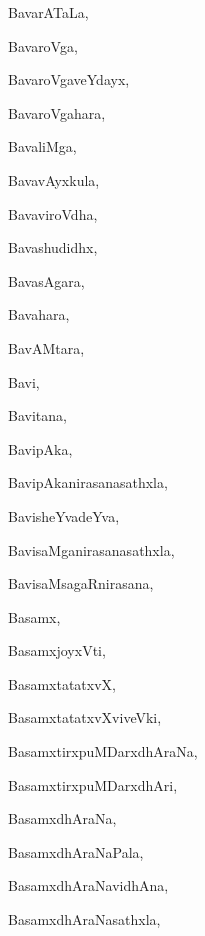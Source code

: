 \begin{multicols}{3}
{\noindent
{BavarATaLa}, \pageref{BavarATaLa}

\noindent
{BavaroVga}, \pageref{BavaroVga}

\noindent
{BavaroVgaveYdayx}, \pageref{BavaroVgaveYdayx}

\noindent
{BavaroVgahara}, \pageref{BavaroVgahara}

\noindent
{BavaliMga}, \pageref{BavaliMga}

\noindent
{BavavAyxkula}, \pageref{BavavAyxkula}

\noindent
{BavaviroVdha}, \pageref{BavaviroVdha}

\noindent
{Bavashudidhx}, \pageref{Bavashudidhx}

\noindent
{BavasAgara}, \pageref{BavasAgara}

\noindent
{Bavahara}, \pageref{Bavahara}

\noindent
{BavAMtara}, \pageref{BavAMtara}

\noindent
{Bavi}, \pageref{Bavi}

\noindent
{Bavitana}, \pageref{Bavitana}

\noindent
{BavipAka}, \pageref{BavipAka}

\noindent
{BavipAkanirasanasathxla}, \pageref{BavipAkanirasanasathxla}

\noindent
{BavisheYvadeYva}, \pageref{BavisheYvadeYva}

\noindent
{BavisaMganirasanasathxla}, \pageref{BavisaMganirasanasathxla}

\noindent
{BavisaMsagaRnirasana}, \pageref{BavisaMsagaRnirasana}

\noindent
{Basamx}, \pageref{Basamx}

\noindent
{BasamxjoyxVti}, \pageref{BasamxjoyxVti}

\noindent
{BasamxtatatxvX}, \pageref{BasamxtatatxvX}

\noindent
{BasamxtatatxvXviveVki}, \pageref{BasamxtatatxvXviveVki}

\noindent
{BasamxtirxpuMDarxdhAraNa}, \pageref{BasamxtirxpuMDarxdhAraNa}

\noindent
{BasamxtirxpuMDarxdhAri}, \pageref{BasamxtirxpuMDarxdhAri}

\noindent
{BasamxdhAraNa}, \pageref{BasamxdhAraNa}

\noindent
{BasamxdhAraNaPala}, \pageref{BasamxdhAraNaPala}

\noindent
{BasamxdhAraNavidhAna}, \pageref{BasamxdhAraNavidhAna}

\noindent
{BasamxdhAraNasathxla}, \pageref{BasamxdhAraNasathxla}

}
\end{multicols}
